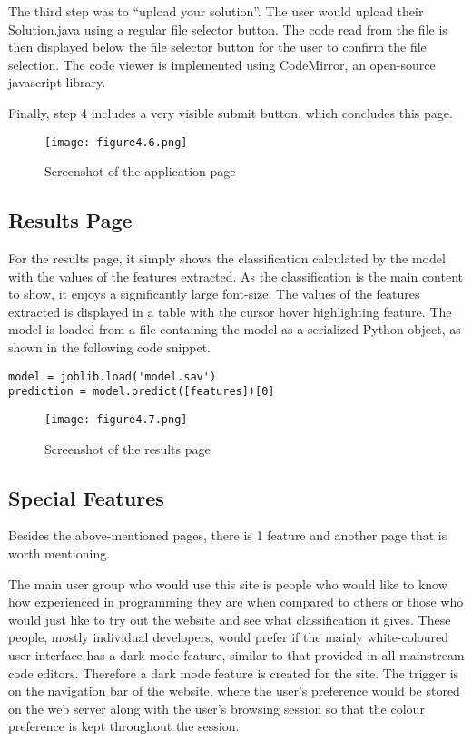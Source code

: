 \documentclass{report}
\begin{document}
The third step was to “upload your solution”. The user would upload their Solution.java using a regular file selector button. The code read from the file is then displayed below the file selector button for the user to confirm the file selection. The code viewer is implemented using CodeMirror, an open-source javascript library.

Finally, step 4 includes a very visible submit button, which concludes this page.

\begin{figure}[h!]
\centering
\texttt{[image: figure4.6.png]}
\caption{Screenshot of the application page}
\end{figure}

\subsection{Results Page}

For the results page, it simply shows the classification calculated by the model with the values of the features extracted. As the classification is the main content to show, it enjoys a significantly large font-size. The values of the features extracted is displayed in a table with the cursor hover highlighting feature. The model is loaded from a file containing the model as a serialized Python object, as shown in the following code snippet.

\begin{lstlisting}
model = joblib.load('model.sav')
prediction = model.predict([features])[0]
\end{lstlisting}

\begin{figure}[h!]
\centering
\texttt{[image: figure4.7.png]}
\caption{Screenshot of the results page}
\end{figure}

\subsection{Special Features}

Besides the above-mentioned pages, there is 1 feature and another page that is worth mentioning.

The main user group who would use this site is people who would like to know how experienced in programming they are when compared to others or those who would just like to try out the website and see what classification it gives. These people, mostly individual developers, would prefer if the mainly white-coloured user interface has a dark mode feature, similar to that provided in all mainstream code editors. Therefore a dark mode feature is created for the site. The trigger is on the navigation bar of the website, where the user’s preference would be stored on the web server along with the user’s browsing session so that the colour preference is kept throughout the session.
\end{document}
